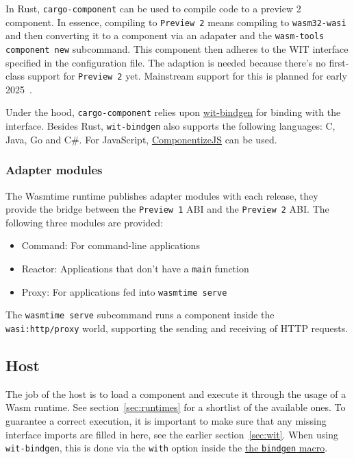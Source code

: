 In Rust, \texttt{cargo-component} can be used to compile code to a preview 2 component. In essence, compiling to \texttt{Preview 2} means compiling to \texttt{wasm32-wasi} and then converting it to a component via an adapater and the \texttt{wasm-tools component new} subcommand. This component then adheres to the \gls{WIT} interface specified in the configuration file. The adaption is needed because there's no first-class support for \texttt{Preview 2} yet. Mainstream support for this is planned for early 2025~\cite{rust:p2}.

Under the hood, \texttt{cargo-component} relies upon \href{https://github.com/bytecodealliance/wit-bindgen}{wit-bindgen} for binding with the interface. Besides Rust, \texttt{wit-bindgen} also supports the following languages: C, Java, Go and C\#. For JavaScript, \href{https://github.com/bytecodealliance/ComponentizeJS}{ComponentizeJS} can be used.

\subsubsection{Adapter modules}

The Wasmtime runtime publishes adapter modules with each release, they provide the bridge between the \texttt{Preview 1} \gls{ABI} and the \texttt{Preview 2} \gls{ABI}. The following three modules are provided:

\begin{itemize}
    \item Command: For command-line applications
    \item Reactor: Applications that don't have a \texttt{main} function
    \item Proxy: For applications fed into \texttt{wasmtime serve}
\end{itemize}

The \texttt{wasmtime serve} subcommand runs a component inside the \texttt{wasi:http/proxy} world, supporting the sending and receiving of HTTP requests.

\subsection{Host}
\label{sec:host}

The job of the host is to load a component and execute it through the usage of a \gls{Wasm} runtime. See section~\ref{sec:runtimes} for a shortlist of the available ones. To guarantee a correct execution, it is important to make sure that any missing interface imports are filled in here, see the earlier section~\ref{sec:wit}. When using \texttt{wit-bindgen}, this is done via the \texttt{with} option inside the \href{https://docs.rs/wasmtime/latest/wasmtime/component/macro.bindgen.html}{the \texttt{bindgen} macro}.

